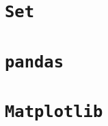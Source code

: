\documentclass{book}
\begin{document}
\frontmatter
\maketitle
\tableofcontents
\mainmatter
\part{\texttt{Set}}

\part{\texttt{pandas}}

\part{\texttt{Matplotlib}}
\end{document}

